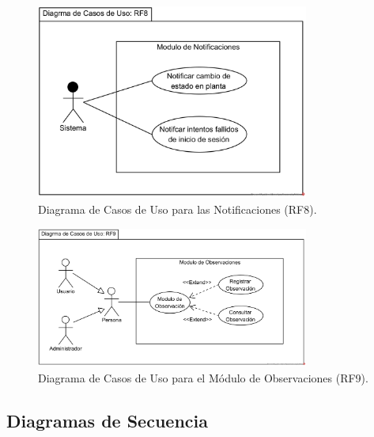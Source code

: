 \begin{figure}[H]
    \centering
    \caption{Diagrama de Casos de Uso para las Notificaciones (RF8).}
    \label{fig:casos-uso-notificaciones}
    \includegraphics[width=0.8\textwidth]{UML/CasosUso/Diagrama de Casos de Uso RF8.png}
\end{figure}


\begin{figure}[H]
    \centering
    \caption{Diagrama de Casos de Uso para el Módulo de Observaciones (RF9).}
    \label{fig:casos-uso-observaciones}
    \includegraphics[width=0.8\textwidth]{UML/CasosUso/Diagrama de Casos de Uso RF9.png}
\end{figure}


\subsection{Diagramas de Secuencia}



